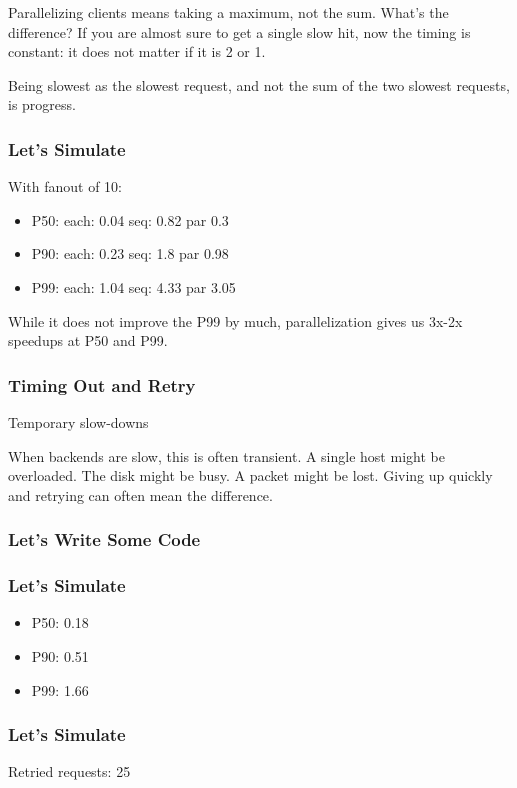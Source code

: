 Parallelizing clients means taking a maximum,
not the sum.
What's the difference?
If you are almost sure to get a single slow hit,
now the timing is constant:
it does not matter if it is 2 or 1.

Being slowest as the slowest request,
and not the sum of the two slowest requests,
is progress.

\begin{frame}
\frametitle{Let's Simulate}

With fanout of 10:

\begin{itemize}
\item P50: each: 0.04 seq: 0.82 par 0.3
\item P90: each: 0.23 seq: 1.8 par 0.98
\item P99: each: 1.04 seq: 4.33 par 3.05
\end{itemize}

\end{frame}

While it does not improve the P99 by much,
parallelization gives us 3x-2x speedups
at P50 and P99.

\begin{frame}
\frametitle{Timing Out and Retry}

Temporary slow-downs

\end{frame}

When backends are slow, this is often transient.
A single host might be overloaded.
The disk might be busy.
A packet might be lost.
Giving up quickly and retrying can often mean the difference.

\begin{frame}
\frametitle{Let's Write Some Code}



\end{frame}


\begin{frame}
\frametitle{Let's Simulate}

\begin{itemize}
\item P50: 0.18
\item P90: 0.51
\item P99: 1.66
\end{itemize}

\end{frame}

\begin{frame}
\frametitle{Let's Simulate}

Retried requests: 25%

\end{frame}


